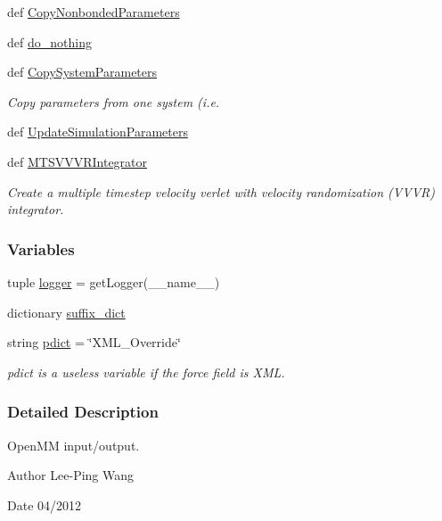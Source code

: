 \begin{DoxyCompactItemize}
\item 
def \hyperlink{namespaceforcebalance_1_1openmmio_afead47464a644d9225f9fa8eb568a8ed}{\-Copy\-Nonbonded\-Parameters}
\item 
def \hyperlink{namespaceforcebalance_1_1openmmio_a2bb7add6b813d94f2655372c51fe8fdc}{do\-\_\-nothing}
\item 
def \hyperlink{namespaceforcebalance_1_1openmmio_a8c6ed589ec2b35b8363a529ffdf88eb0}{\-Copy\-System\-Parameters}
\begin{DoxyCompactList}\small\item\em \-Copy parameters from one system (i.\-e. \end{DoxyCompactList}\item 
def \hyperlink{namespaceforcebalance_1_1openmmio_a9f9fc56475dbfcc94a40fef6a84ed25f}{\-Update\-Simulation\-Parameters}
\item 
def \hyperlink{namespaceforcebalance_1_1openmmio_aa085594c11e9cd00ce71f5a8ead72b68}{\-M\-T\-S\-V\-V\-V\-R\-Integrator}
\begin{DoxyCompactList}\small\item\em \-Create a multiple timestep velocity verlet with velocity randomization (\-V\-V\-V\-R) integrator. \end{DoxyCompactList}\end{DoxyCompactItemize}
\subsubsection*{\-Variables}
\begin{DoxyCompactItemize}
\item 
tuple \hyperlink{namespaceforcebalance_1_1openmmio_a0bc9824cef66870d9e86c5fb5de9a2e4}{logger} = get\-Logger(\-\_\-\-\_\-name\-\_\-\-\_\-)
\item 
dictionary \hyperlink{namespaceforcebalance_1_1openmmio_a2a12654c34f4f34e81f575f7b470bf8e}{suffix\-\_\-dict}
\item 
string \hyperlink{namespaceforcebalance_1_1openmmio_a665be6f97a91b103188288e8cd1de9a8}{pdict} = \char`\"{}\-X\-M\-L\-\_\-\-Override\char`\"{}
\begin{DoxyCompactList}\small\item\em pdict is a useless variable if the force field is \-X\-M\-L. \end{DoxyCompactList}\end{DoxyCompactItemize}


\subsubsection{\-Detailed \-Description}
\-Open\-M\-M input/output. \begin{DoxyAuthor}{\-Author}
\-Lee-\/\-Ping \-Wang 
\end{DoxyAuthor}
\begin{DoxyDate}{\-Date}
04/2012 
\end{DoxyDate}


